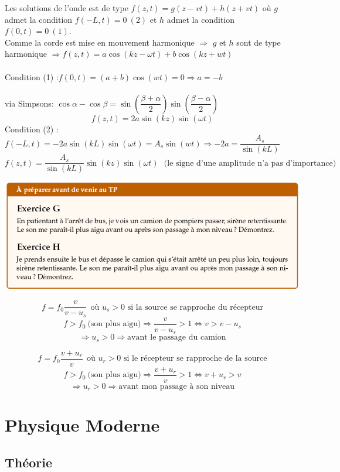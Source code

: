 \documentclass	[11pt, a4paper, openany]{book}
\begin{document}
		Les solutions de l'onde est de type $f(z,t)=g(z-vt)+h(z+vt)$ où $g$ admet la condition $f(-L,t)=0\ (2)$ et $h$ admet la condition $f(0,t)=0\ (1)$.\\
		Comme la corde est mise en mouvement harmonique $\Rightarrow$ $g$ et $h$ sont de type harmonique $\Rightarrow f(z,t)=a\cos(kz-\omega t)+b\cos(kz+wt)$\\\\
		Condition (1) :$f(0,t)=(a+b)\cos(wt)=0\Rightarrow a=-b$\\\\
		via Simpsons: $\cos\alpha-\cos\beta=\sin\left(\dfrac{\beta+\alpha}{2}\right)\sin\left(\dfrac{\beta-\alpha}{2}\right)$
		$$f(z,t)=2a\sin(kz)\sin(\omega t)$$
		Condition (2) : $f(-L,t)=-2a\sin(kL)\sin(\omega t)=A_s\sin(wt)\Rightarrow-2a=\dfrac{A_s}{\sin(kL)}$
		$$f(z,t)=\frac{A_s}{\sin(kL)}\sin(kz)\sin(\omega t)\ \ \ \text{(le signe d'une amplitude n'a pas d'importance)}$$
		
		\begin{center}
			\includegraphics[scale=0.85]{prepa/Ondes-GH.png}\\
		\end{center}
		$$f=f_0\frac{v}{v-u_s}\ \ \text{où $u_s>0$ si la source se rapproche du récepteur}$$
		$$f>f_0\ \text{(son plus aigu)} \Rightarrow \frac{v}{v-u_s}>1\Leftrightarrow v>v-u_s$$
		$$\Rightarrow u_s>0\Rightarrow\text{avant le passage du camion}$$
		
		$$f=f_0\frac{v+u_r}{v}\ \ \text{où $u_r>0$ si le récepteur se rapproche de la source}$$
		$$f>f_0\ \text{(son plus aigu)} \Rightarrow \frac{v+u_r}{v}>1\Leftrightarrow v+u_r>v$$
		$$\Rightarrow u_r>0\Rightarrow\text{avant mon passage à son niveau}$$
		
		
		\newpage
		\section{Physique Moderne}
		\subsection{Théorie}
		
\end{document}

